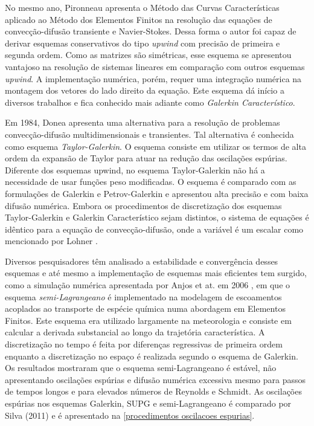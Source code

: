 \medskip
No mesmo ano, Pironneau \cite{pironneau1982} apresenta o Método das Curvas Características
aplicado ao Método dos Elementos Finitos na resolução das equações de convecção-difusão transiente
e Navier-Stokes. Dessa forma o autor foi capaz de derivar esquemas conservativos 
do tipo \textit{upwind} com precisão de primeira e segunda ordem. 
Como as matrizes são simétricas, esse esquema
se apresentou vantajoso na resolução de sistemas lineares em comparação com outros esquemas \textit{upwind}.
A implementação numérica, porém, requer uma integração numérica na montagem dos vetores
do lado direito da equação. Este esquema dá início a diversos trabalhos e 
fica conhecido mais adiante como \textit{Galerkin Característico}.

\medskip
Em 1984, Donea \cite{donea1984} apresenta uma alternativa para a resolução de problemas 
convecção-difusão multidimensionais e transientes.
Tal alternativa é conhecida como esquema \textit{Taylor-Galerkin}.
O esquema consiste em utilizar os termos de alta ordem da expansão de Taylor 
para atuar na redução das oscilações espúrias.
Diferente dos esquemas upwind, no esquema Taylor-Galerkin não há a necessidade 
de usar funções peso modificadas.
O esquema é comparado com as formulações de Galerkin e Petrov-Galerkin 
e apresentou alta precisão e com baixa difusão numérica.
Embora os procedimentos de discretização dos esquemas Taylor-Galerkin e Galerkin Característico
sejam distintos, o sistema de equações é idêntico para a equação de convecção-difusão, onde 
a variável é um escalar como mencionado por Lohner \cite{lohner1984}. 

\medskip
Diversos pesquisadores têm analisado a estabilidade e convergência desses esquemas
e até mesmo a implementação de esquemas mais eficientes tem surgido, como a simulação
numérica apresentada por Anjos et at. em 2006 \cite{anjos2006}, 
em que o esquema \textit{semi-Lagrangeano} é implementado
na modelagem de escoamentos acoplados ao transporte de espécie química numa abordagem
em Elementos Finitos. Este esquema era utilizado largamente na meteorologia e
consiste em calcular a derivada substancial ao longo da trajetória característica.
A discretização no tempo é feita por diferenças regressivas de primeira ordem
enquanto a discretização no espaço é realizada segundo o esquema de Galerkin.
Os resultados mostraram que o esquema semi-Lagrangeano é estável, não apresentando
oscilações espúrias e difusão numérica excessiva mesmo para passos de tempos longos 
e para elevados números de Reynolds e Schmidt. As oscilações espúrias nos esquemas Galerkin, SUPG e semi-Lagrangeano é comparado
por Silva (2011) \cite{silva2011} e é apresentado na \ref{procedimentos oscilacoes espurias}.


